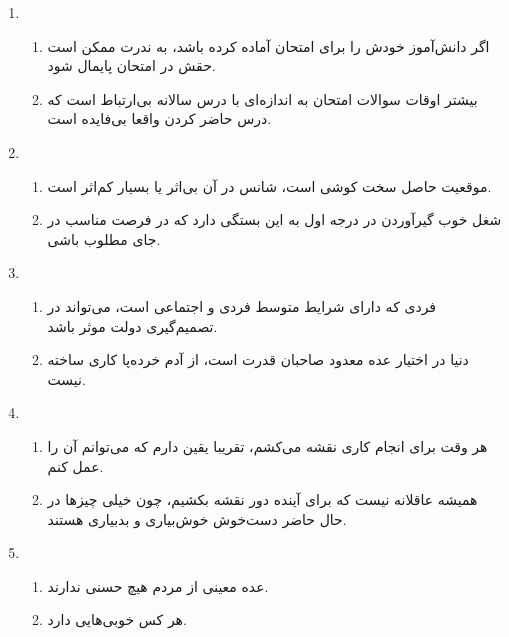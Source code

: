 \documentclass[a4paper,10pt]{article}
\begin{document}
\begin{enumerate}
 \item \begin{enumerate}
        \item اگر دانش‌آموز خودش را برای امتحان آماده کرده باشد، به ندرت ممکن است حقش در امتحان پایمال شود.
	\item بیشتر اوقات سوالات امتحان به اندازه‌ای با درس سالانه بی‌ارتباط است که درس حاضر کردن واقعا بی‌فایده است.
       \end{enumerate}

\hdashline

 \item \begin{enumerate}
        \item موقعیت حاصل سخت کوشی است، شانس در آن بی‌اثر یا بسیار کم‌اثر است.
	\item شغل خوب گیرآوردن در درجه اول به این بستگی دارد که در فرصت مناسب در جای مطلوب باشی.
       \end{enumerate}

\hdashline

\pagebreak

 \item \begin{enumerate}
        \item فردی که دارای شرایط متوسط فردی و اجتماعی است، می‌تواند در تصمیم‌گیری دولت موثر باشد.
	\item دنیا در اختیار عده معدود صاحبان قدرت است، از آدم خرده‌پا کاری ساخته نیست.

       \end{enumerate}

\hdashline


 \item \begin{enumerate}
        \item هر وقت برای انجام کاری نقشه می‌کشم، تقریبا یقین دارم که می‌توانم آن را عمل کنم.
	\item همیشه عاقلانه نیست که برای آینده دور نقشه بکشیم، چون خیلی چیزها در حال حاضر دست‌خوش خوش‌بیاری و بدبیاری هستند.
       \end{enumerate}

\hdashline

 \item \begin{enumerate}
        \item عده معینی از مردم هیچ حسنی ندارند.
	\item هر کس خوبی‌هایی دارد.
       \end{enumerate}


\end{enumerate}
\end{document}
